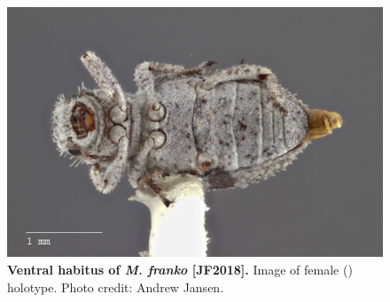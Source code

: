 \documentclass[fleqn,10pt,lineno]{wlpeerj} %
\begin{document}
\begin{figure}[h]
	\begin{sideways}
		\centering
		\includegraphics[height=\textwidth]{figure16.jpg}
	\end{sideways}
	\caption{\textbf{Ventral habitus of \textit{M. franko} [JF2018].} Image of female (\female) holotype. Photo credit: Andrew Jansen.}
	\label{fig:franko_F_ventral}
\end{figure}
\end{document}
